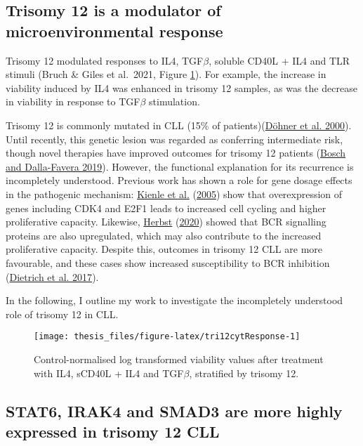 \documentclass[11pt, a4paper, twosided]{book}
\begin{document}
\hypertarget{trisomy12-modulator}{%
\subsection{Trisomy 12 is a modulator of microenvironmental response}\label{trisomy12-modulator}}

Trisomy 12 modulated responses to IL4, TGF\(\beta\), soluble CD40L + IL4 and TLR stimuli (Bruch \& Giles et al.~2021, Figure \ref{fig:tri12cytResponse}). For example, the increase in viability induced by IL4 was enhanced in trisomy 12 samples, as was the decrease in viability in response to TGF\(\beta\) stimulation.

Trisomy 12 is commonly mutated in CLL (15\% of patients)(\protect\hyperlink{ref-Dohner2000}{Döhner et al. 2000}). Until recently, this genetic lesion was regarded as conferring intermediate risk, though novel therapies have improved outcomes for trisomy 12 patients (\protect\hyperlink{ref-Bosch2019}{Bosch and Dalla-Favera 2019}). However, the functional explanation for its recurrence is incompletely understood. Previous work has shown a role for gene dosage effects in the pathogenic mechanism: \protect\hyperlink{ref-Kienle2005}{Kienle et al.} (\protect\hyperlink{ref-Kienle2005}{2005}) show that overexpression of genes including CDK4 and E2F1 leads to increased cell cycling and higher proliferative capacity. Likewise, \protect\hyperlink{ref-HerbstThesis}{Herbst} (\protect\hyperlink{ref-HerbstThesis}{2020}) showed that BCR signalling proteins are also upregulated, which may also contribute to the increased proliferative capacity. Despite this, outcomes in trisomy 12 CLL are more favourable, and these cases show increased susceptibility to BCR inhibition (\protect\hyperlink{ref-JCIpaper}{Dietrich et al. 2017}).

In the following, I outline my work to investigate the incompletely understood role of trisomy 12 in CLL.


\begin{figure}

{\centering \texttt{[image: thesis\_files/figure-latex/tri12cytResponse-1]} 

}

\caption{Control-normalised log transformed viability values after treatment with IL4, sCD40L + IL4 and TGF\(\beta\), stratified by trisomy 12.}\label{fig:tri12cytResponse}
\end{figure}
\hypertarget{gene-dosage-effects}{%
\subsection{STAT6, IRAK4 and SMAD3 are more highly expressed in trisomy 12 CLL}\label{gene-dosage-effects}}
\end{document}

